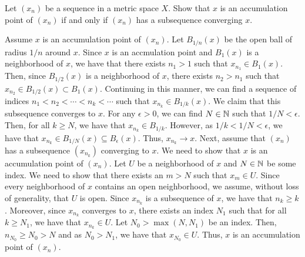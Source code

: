 \documentclass[12pt]{article}
\begin{document}
\begin{problem}{52}
    Let $(x_n)$ be a sequence in a metric space $X$. Show that $x$ is an accumulation point of $(x_n)$ if and only if $(x_n)$ has a subsequence converging $x$. 
\end{problem}
\begin{solution}
    Assume $x$ is an accumulation point of $(x_n)$. Let $B_{1/n}(x)$ be the open ball of radius $1/n$ around $x$. Since $x$ is an accmulation point and $B_{1}(x)$ is a neighborhood of $x$, we have that there exists $n_1 > 1$ such that $x_{n_1} \in B_{1}(x)$. Then, since $B_{1/2}(x)$ is a neighborhood of $x$, there exists $n_2 > n_1$ such that $x_{n_2} \in B_{1/2}(x) \subset B_{1}(x)$. Continuing in this manner, we can find a sequence of indices $n_1 < n_2 < \cdots < n_k < \cdots$ such that $x_{n_k} \in B_{1/k}(x)$. We claim that this subsequence converges to $x$. \bbni
    For any $\epsilon > 0$, we can find $N \in \mathbb N$ such that $1/N < \epsilon$. Then, for all $k \geq N$, we have that $x_{n_{k}} \in B_{1/k}$. However, as $1/k < 1/N < \epsilon$, we have that $x_{n_k} \in B_{1/N}(x) \subseteq B_\epsilon(x)$. Thus, $x_{n_k} \to x$. \bbni
    Next, assume that $(x_n)$ has a subsequence $(x_{n_k})$ converging to $x$. We need to show that $x$ is an accumulation point of $(x_n)$. \bbni
    Let $U$ be a neighborhood of $x$ and $N \in \mathbb N$ be some index. We need to show that there exists an $m > N$ such that $x_{m} \in U$. \bbni
    Since every neighborhood of $x$ contains an open neighborhood, we assume, without loss of generality, that $U$ is open. Since $x_{n_k}$ is a subsequence of $x$, we have that $n_k \geq k$. Moreover, since $x_{n_k}$ converges to $x$, there exists an index $N_1$ such that for all $k \geq N_1$, we have that $x_{n_k} \in U$. \bbni 
    Let $N_0 > \max(N, N_1)$ be an index. Then, $n_{N_0} \geq N_0 > N$ and as $N_0 > N_1$, we have that $x_{N_0} \in U$. Thus, $x$ is an accumulation point of $(x_n)$. 
\end{solution}
\end{document}
